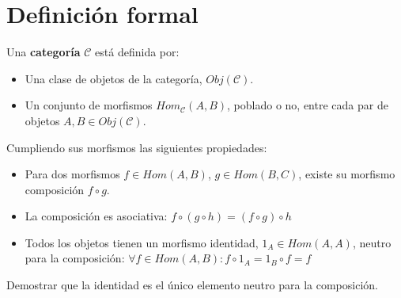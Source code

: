 \documentclass[11pt, fleqn, spanish]{book}
\newcommand{\C}{\mathcal{C} }
\begin{document}
  \section {Definición formal}
    \begin{definition}
    Una \textbf{categoría} $\C$ está definida por:
    \begin{itemize}
      \item Una clase de objetos de la categoría, $Obj(\mathcal{C})$.
      \item Un conjunto de morfismos $Hom_{\C}(A,B)$, poblado o no, entre cada par de objetos $A,B \in Obj(\C)$.
    \end{itemize}
    \end{definition}

    Cumpliendo sus morfismos las siguientes propiedades:
    \begin{itemize}
      \item Para dos morfismos $f \in Hom(A,B)$, $g \in Hom(B,C)$, existe su morfismo composición $f \circ g$.
      \item La composición es asociativa: $ f \circ (g \circ h) = (f \circ g) \circ h$
      \item Todos los objetos tienen un morfismo identidad, $1_{A} \in Hom(A,A)$, 
	  neutro para la composición: $\forall f \in Hom(A,B): f \circ 1_{A} = 1_{B} \circ f = f$
    \end{itemize}
    
    \begin{exercise}
      Demostrar que la identidad es el único elemento neutro para la composición.
    \end{exercise}
  
\end{document}
